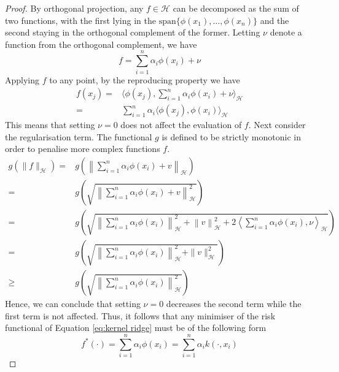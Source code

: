 \begin{proof}
    By orthogonal projection, any $f \in \mathcal{H}$ can be decomposed as the sum of two functions, with the first lying in the $\textrm{span}\{\phi(x_1),\dots, \phi(x_n)\}$ and the second staying in the orthogonal complement of the former. Letting $\nu$ denote a function from the orthogonal complement, we have
    \begin{equation}
        f=\sum\limits_{i=1}^{n}\alpha_i \phi(x_i)+\nu
    \end{equation}
    Applying $f$ to any point, by the reproducing property we have
    \begin{equation}
        \begin{aligned}
            f(x_j)=&\langle \phi(x_j), \sum\limits_{i=1}^{n}\alpha_i \phi(x_i)+\nu\rangle_{\mathcal{H}}
            \\
            =&\sum\limits_{i=1}^{n}\alpha_i\langle \phi(x_j), \phi(x_i)\rangle_{\mathcal{H}}
        \end{aligned}
    \end{equation}
    This means that setting $\nu=0$ does not affect the evaluation of $f$.
    Next consider the regularisation term. The functional $g$ is defined to be strictly monotonic in order to penalise more complex functions $f$.
    \begin{equation}
        \begin{aligned}
            g(\|f\|_{\mathcal{H}})=&g\left(\left\|\sum\limits_{i=1}^n \alpha_i \phi(x_i)+v\right\|_\mathcal{H}\right)
            \\
            =&g\left(\sqrt{\left\|\sum\limits_{i=1}^n \alpha_i \phi(x_i)+v\right\|_\mathcal{H}^2}\right)
            \\
            =&g\left(\sqrt{\left\|\sum\limits_{i=1}^n \alpha_i \phi(x_i)\right\|_{\mathcal{H}}^2+\left\|v\right\|_\mathcal{H}^2+2\left\langle\sum\limits_{i=1}^n \alpha_i \phi(x_i),\nu \right\rangle_{\mathcal{H}}}\right)
            \\
            =&g\left(\sqrt{\left\|\sum\limits_{i=1}^n \alpha_i \phi(x_i)\right\|_{\mathcal{H}}^2+\|v\|_\mathcal{H}^2}\right)
            \\
            \geq &g\left(\sqrt{\left\|\sum\limits_{i=1}^n \alpha_i \phi(x_i)\right\|_{\mathcal{H}}^2}\right)
        \end{aligned}
    \end{equation}
    Hence, we can conclude that setting $\nu=0$ decreases the second term while the first term is not affected. Thus, it follows that any minimiser of the risk functional of Equation \ref{eq:kernel ridge} must be of the following form
    \begin{equation}
        f^*(\cdot)=\sum\limits_{i=1}^n \alpha_i \phi(x_i)=\sum\limits_{i=1}^n \alpha_i k(\cdot, x_i)
    \end{equation}
\end{proof}

